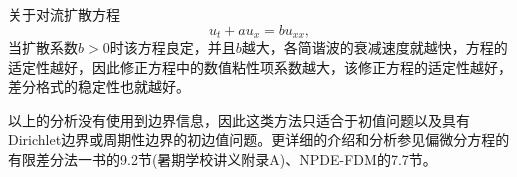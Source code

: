 \documentclass[a4paper,10pt]{ctexart}
\begin{document}
关于对流扩散方程
\begin{equation}
    u_t+au_x = bu_{xx},
\end{equation}
当扩散系数$ b>0 $时该方程良定，并且$ b $越大，各简谐波的衰减速度就越快，方程的适定性越好，因此修正方程中的数值粘性项系数越大，该修正方程的适定性越好，差分格式的稳定性也就越好。

以上的分析没有使用到边界信息，因此这类方法只适合于初值问题以及具有Dirichlet边界或周期性边界的初边值问题。更详细的介绍和分析参见偏微分方程的有限差分法一书的9.2节(暑期学校讲义附录A)、NPDE-FDM的7.7节。
\end{document}
